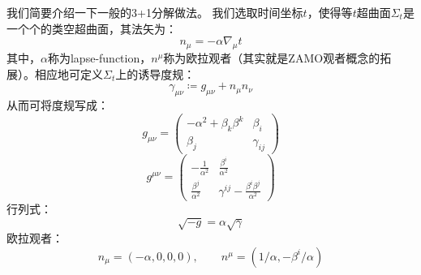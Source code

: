 \documentclass[lang=cn,color=blue,cm,11pt,scheme=chinese,bibend=bibtex,sorting=nty]{elegantbook}
\begin{document}
	\begin{note}
		我们简要介绍一下一般的3+1分解做法。
		我们选取时间坐标$t$，使得等$t$超曲面$\Sigma_t$是一个个的类空超曲面，其法矢为：
		\begin{equation}
			n_{\mu} = - \alpha \nabla_{\mu} t
		\end{equation}
		其中，$\alpha$称为lapse-function，$n^{\mu}$称为欧拉观者（其实就是ZAMO观者概念的拓展）。相应地可定义$\Sigma_t$上的诱导度规：
		\begin{equation}
			\gamma_{\mu \nu} \coloneqq g_{\mu \nu} + n_{\mu} n_{\nu}
		\end{equation}
		从而可将度规写成：
		\begin{equation}
			g_{\mu \nu} = \begin{pmatrix}
				- \alpha^2 + \beta_k \beta^k & \beta_i\\
				\beta_j & \gamma_{i j}
			\end{pmatrix}
		\end{equation}
		\begin{equation}
			g^{\mu \nu} = \begin{pmatrix}
				- \frac{1}{\alpha^2} & \frac{\beta^i}{\alpha^2}\\
				\frac{\beta^j}{\alpha^2} & \gamma^{i j} - \frac{\beta^i \beta^j}{\alpha^2}
			\end{pmatrix}
		\end{equation}
		行列式：
		\begin{equation}
			\sqrt{- g} = \alpha \sqrt{\gamma}
		\end{equation}
		欧拉观者：
		\begin{equation}
			n_{\mu} = (- \alpha, 0, 0, 0), \qquad n^{\mu} = (1 / \alpha, - \beta^i / \alpha)
		\end{equation}
	\end{note}
	
\end{document}
